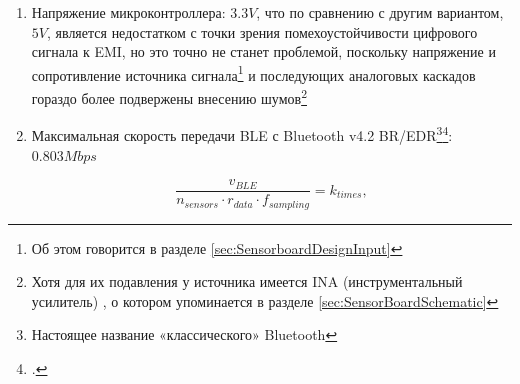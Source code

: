 \documentclass[a4paper, 10pt, final]{article} %
\newcommand{\parenciteit}[2]{\textit{\parencite[#1]{#2}}} %
\begin{document}
\begin{enumerate}[label=\emph{(\arabic*)}]
            \begin{figure}[H]
                \centering
                \begin{minipage}[b]{.3\linewidth}
                    \centering
                    \[
                        f_{MSCLK} - f_{SSCLK} > 0Hz \mathrm{,}
                    \]
                \end{minipage}
                \begin{minipage}[b]{.3\linewidth}
                    \centering
                    \[
                        50MHz - 10MHz > 0Hz
                    \]
                \end{minipage}
                \begin{minipage}[b]{.3\linewidth}
                    \centering
                    \[
                        40MHz > 0Hz
                    \]
                \end{minipage}
            \end{figure}
            \noindent Зная также максимальную частоту связи АЦП, можно сказать, что микроконтроллер не является ограничивающим фактором\footnote{Хотя в разделе \ref{sec:SensorboardCharacteristics}будет сказано, что больше и не нужно}. 
        \item Напряжение микроконтроллера: $3.3V$, что по сравнению с другим вариантом, $5V$, является недостатком с точки зрения помехоустойчивости цифрового сигнала к EMI, но это точно не станет проблемой, поскольку напряжение и сопротивление источника сигнала\footnote{Об этом говорится в разделе \ref{sec:SensorboardDesignInput}} и последующих аналоговых каскадов гораздо более подвержены внесению шумов\footnote{Хотя для их подавления у источника имеется INA (инструментальный усилитель) \parenciteit{}{INA:Wiki}, о котором упоминается в разделе \ref{sec:SensorBoardSchematic}} 
        \item Максимальная скорость передачи BLE с Bluetooth v4.2 BR/EDR\footnote{Настоящее название «классического» Bluetooth}\footcite[]{BLEThroughput:Wiki}: $0.803Mbps$
            \begin{figure}[H]
                \centering
                \begin{minipage}[b]{.35\linewidth}
                    \centering
                    \[
                        \frac{v_{BLE}}{n_{sensors} \cdot r_{data} \cdot f_{sampling}} = k_{times} \mathrm{,}
                    \]

\end{minipage}
\end{figure}
\end{enumerate}
\end{document}

